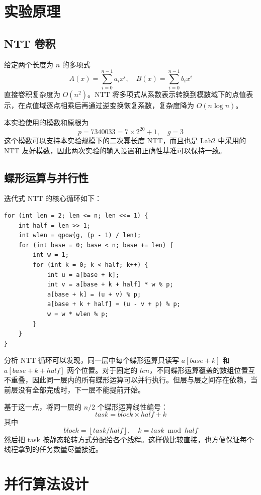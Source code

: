 \documentclass[a4paper,12pt]{ctexart}
\begin{document}
\section{实验原理}

\subsection{NTT 卷积}

给定两个长度为 $n$ 的多项式
\[
A(x)=\sum_{i=0}^{n-1}a_i x^i,\quad B(x)=\sum_{i=0}^{n-1}b_i x^i
\]
直接卷积复杂度为 $O(n^2)$。NTT 将多项式从系数表示转换到模数域下的点值表示，在点值域逐点相乘后再通过逆变换恢复系数，复杂度降为 $O(n\log n)$。

本实验使用的模数和原根为
\[
p=7340033=7\times 2^{20}+1,\quad g=3
\]
这个模数可以支持本实验规模下的二次幂长度 NTT，而且也是 Lab2 中采用的 NTT 友好模数，因此两次实验的输入设置和正确性基准可以保持一致。

\subsection{蝶形运算与并行性}

迭代式 NTT 的核心循环如下：

\begin{lstlisting}[title=串行 NTT 核心循环]
for (int len = 2; len <= n; len <<= 1) {
    int half = len >> 1;
    int wlen = qpow(g, (p - 1) / len);
    for (int base = 0; base < n; base += len) {
        int w = 1;
        for (int k = 0; k < half; k++) {
            int u = a[base + k];
            int v = a[base + k + half] * w % p;
            a[base + k] = (u + v) % p;
            a[base + k + half] = (u - v + p) % p;
            w = w * wlen % p;
        }
    }
}
\end{lstlisting}

分析 NTT 循环可以发现，同一层中每个蝶形运算只读写 $a[base+k]$ 和 $a[base+k+half]$ 两个位置。对于固定的 $len$，不同蝶形运算覆盖的数组位置互不重叠，因此同一层内的所有蝶形运算可以并行执行。但层与层之间存在依赖，当前层没有全部完成时，下一层不能提前开始。

基于这一点，将同一层的 $n/2$ 个蝶形运算线性编号：
\[
task = block \times half + k
\]
其中
\[
block=\left\lfloor task/half\right\rfloor,\quad k=task\bmod half
\]
然后把 task 按静态轮转方式分配给各个线程。这样做比较直接，也方便保证每个线程拿到的任务数量尽量接近。

\section{并行算法设计}
\end{document}
